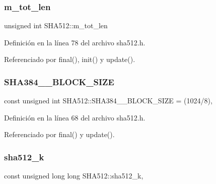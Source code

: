 \hypertarget{classSHA512_a99134ffe06076eaf88e6db543304d0ef}{}\label{classSHA512_a99134ffe06076eaf88e6db543304d0ef} 
\subsubsection{\texorpdfstring{m\+\_\+tot\+\_\+len}{m\_tot\_len}}
{\footnotesize\ttfamily unsigned int S\+H\+A512\+::m\+\_\+tot\+\_\+len\hspace{0.3cm}{\ttfamily [protected]}}



Definición en la línea 78 del archivo sha512.\+h.



Referenciado por final(), init() y update().

\hypertarget{classSHA512_a5191f35aa313f5fd0447d2c272a82c99}{}\label{classSHA512_a5191f35aa313f5fd0447d2c272a82c99} 
\subsubsection{\texorpdfstring{S\+H\+A384\+\_\+\_\+\+B\+L\+O\+C\+K\+\_\+\+S\+I\+ZE}{SHA384\_512\_BLOCK\_SIZE}}
{\footnotesize\ttfamily const unsigned int S\+H\+A512\+::\+S\+H\+A384\+\_\+\_\+\+B\+L\+O\+C\+K\+\_\+\+S\+I\+ZE = (1024/8)\hspace{0.3cm}{\ttfamily [static]}, {\ttfamily [protected]}}



Definición en la línea 68 del archivo sha512.\+h.



Referenciado por final() y update().

\hypertarget{classSHA512_af6d393ef5aa7458c3545efa1b9d92900}{}\label{classSHA512_af6d393ef5aa7458c3545efa1b9d92900} 
\subsubsection{\texorpdfstring{sha512\+\_\+k}{sha512\_k}}
{\footnotesize\ttfamily const unsigned long long S\+H\+A512\+::sha512\+\_\+k\hspace{0.3cm}{\ttfamily [static]}, {\ttfamily [protected]}}



